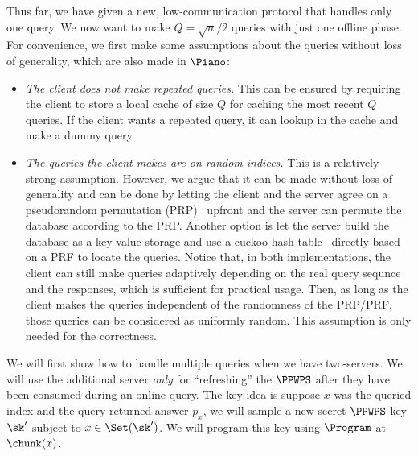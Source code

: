 Thus far, we have
given a new, low-communication protocol that handles only one query. We now want
to make $Q=\sqrt{n}/2$ queries with just one offline phase. For convenience, we
first make some assumptions about the queries without loss of generality, which
are also made in $\Piano$:
\begin{itemize}
    \item \textit{The client does not make repeated queries.} This can be ensured 
    by requiring the client to store a local cache of size $Q$ for caching the
    most recent $Q$ queries. If the client wants a repeated query, it can lookup
    in the cache and make a dummy query.
    
    \item \textit{The queries the client makes are on random indices.} This is a relatively
    strong assumption. However, we argue that it can be made without loss of
    generality and can be done by letting the client and the server agree on a
    pseudorandom permutation (PRP)~\cite{prp1,prp2} upfront and the server can
    permute the database according to the PRP. Another option is let the server
    build the database as a key-value storage and use a cuckoo hash
    table~\cite{cuckoo1,cuckoo2} directly based on a PRF to locate the queries.
    Notice that, in both implementations, the client can still make queries
    adaptively depending on the real query sequnce and the responses, which is
    sufficient for practical usage. Then, as long as the client makes the
    queries independent of the randomness of the PRP/PRF, those queries can be
    considered as uniformly random. This assumption is only needed for the
    correctness.
\end{itemize}



We will first show how to handle multiple queries when we have two-servers. We will use the additional server \emph{only} for ``refreshing'' the $\PPWPS$ after they have been consumed during an online query. The key idea is suppose $x$ was the queried index and the query returned answer $p_x$, we will sample a new secret $\PPWPS$ key $\sk'$ subject to $x\in\Set(\sk')$. We will program this key using $\Program$ at $\chunk(x)$.